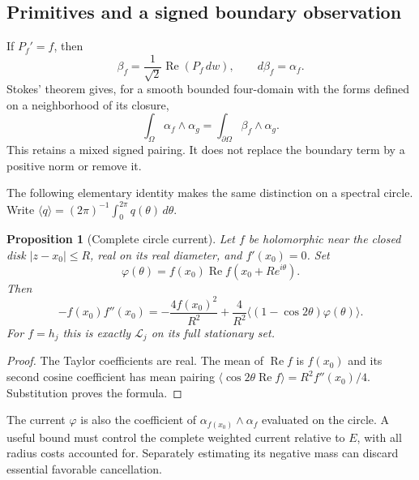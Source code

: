\documentclass[11pt]{article}
\numberwithin{equation}{section}
\newtheorem{proposition}[theorem]{Proposition}
\theoremstyle{definition}
\theoremstyle{remark}
\begin{document}
\subsection{Primitives and a signed boundary observation}
If $P_f'=f$, then
\[
 \beta_f=\frac1{\sqrt2}\operatorname{Re}(P_f\,dw),\qquad
 d\beta_f=\alpha_f.
\]
Stokes' theorem gives, for a smooth bounded four-domain with the forms
defined on a neighborhood of its closure,
\begin{equation}\label{forms:stokes}
 \int_\Omega\alpha_f\wedge\alpha_g
 =\int_{\partial\Omega}\beta_f\wedge\alpha_g.
\end{equation}
This retains a mixed signed pairing.  It does not replace the boundary
term by a positive norm or remove it.

The following elementary identity makes the same distinction on a
spectral circle.  Write $\langle q\rangle=(2\pi)^{-1}
\int_0^{2\pi}q(\theta)\,d\theta$.
\begin{proposition}[Complete circle current]\label{forms:circle}
Let $f$ be holomorphic near the closed disk $|z-x_0|\le R$, real on
its real diameter, and $f'(x_0)=0$.  Set
\[
 \varphi(\theta)=f(x_0)\operatorname{Re} f(x_0+Re^{i\theta}).
\]
Then
\begin{equation}\label{forms:circle-identity}
 -f(x_0)f''(x_0)
 =-\frac{4f(x_0)^2}{R^2}
   +\frac4{R^2}\langle(1-\cos2\theta)\varphi(\theta)\rangle.
\end{equation}
For $f=h_j$ this is exactly $\mathcal L_j$ on its full stationary set.
\end{proposition}
\begin{proof}
The Taylor coefficients are real.  The mean of $\operatorname{Re} f$
is $f(x_0)$ and its second cosine coefficient has mean pairing
$\langle\cos2\theta\operatorname{Re}f\rangle=R^2 f''(x_0)/4$.
Substitution proves the formula.
\end{proof}
The current $\varphi$ is also the coefficient of
$\alpha_{f(x_0)}\wedge\alpha_f$ evaluated on the circle.  A useful bound
must control the complete weighted current relative to $E$, with all
radius costs accounted for.  Separately estimating its negative mass can
discard essential favorable cancellation.
\end{document}
